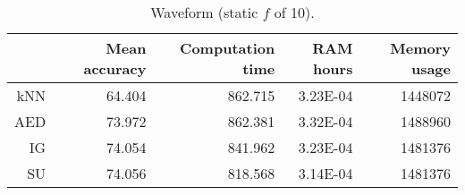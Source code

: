 \begin{table}[h]
\centering
\begin{tabular}{r|rrrr}
    & Mean accuracy & Computation time & RAM hours & Memory usage \\ \hline
kNN & 64.404                   & 862.715          & 3.23E-04  & 1448072      \\
AED & 73.972                   & 862.381          & 3.32E-04  & 1488960      \\
IG  & 74.054                   & 841.962          & 3.23E-04  & 1481376      \\
SU  & 74.056                   & 818.568          & 3.14E-04  & 1481376     
\end{tabular}
\caption{Waveform (static $f$ of 10).}
\label{Table:Waveform}
\end{table}